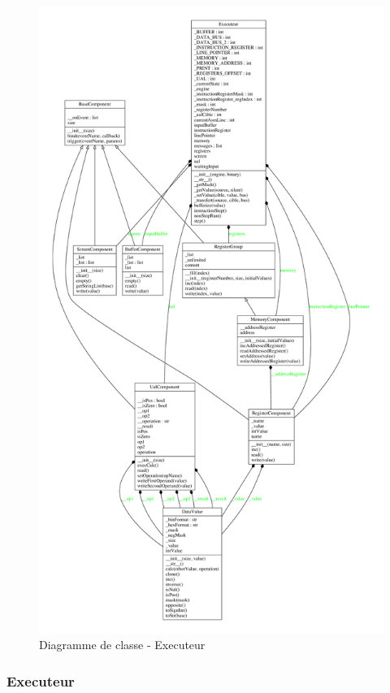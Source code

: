\begin{figure}[p]
	\centering
	\includegraphics[height = 0.85\textheight]{./Pictures/Executeur.pdf}
	\caption{\label{fig:class_Executeur} Diagramme de classe - Executeur}
\end{figure}

\subsubsection{Executeur}

